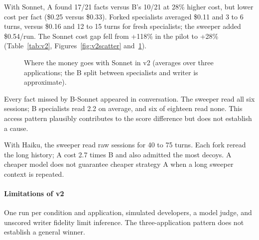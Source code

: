 With Sonnet, A found 17/21 facts versus B's 10/21 at 28\% higher cost, but lower cost per fact (\$0.25 versus \$0.33). Forked specialists averaged \$0.11 and 3 to 6 turns, versus \$0.16 and 12 to 15 turns for fresh specialists; the sweeper added \$0.54/run. The Sonnet cost gap fell from +118\% in the pilot to +28\% (Table~\ref{tab:v2}, Figures~\ref{fig:v2scatter} and~\ref{fig:v2split}).

\begin{figure}[htbp]
\centering
{}
\caption{Where the money goes with Sonnet in v2 (averages over three applications; the B split between specialists and writer is approximate).}
\label{fig:v2split}
\end{figure}

Every fact missed by B-Sonnet appeared in conversation. The sweeper read all six sessions; B specialists read 2.2 on average, and six of eighteen read none. This access pattern plausibly contributes to the score difference but does not establish a cause.

With Haiku, the sweeper read raw sessions for 40 to 75 turns. Each fork reread the long history; A cost 2.7 times B and also admitted the most decoys. A cheaper model does not guarantee cheaper strategy A when a long sweeper context is repeated.

\paragraph{Limitations of v2} One run per condition and application, simulated developers, a model judge, and unscored writer fidelity limit inference. The three-application pattern does not establish a general winner.

